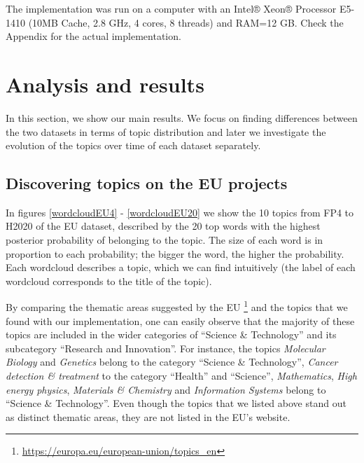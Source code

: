 \documentclass[12pt]{report}
\begin{document}
The implementation was run on a computer with an Intel® Xeon® Processor E5-1410
(10MB Cache, 2.8 GHz, 4 cores, 8 threads) and RAM=12 GB. Check the Appendix for 
the actual implementation.
\pagebreak

\section{Analysis and results}
\label{analysis}
In this section, we show our main results. We focus on finding
differences between the two datasets in terms of topic distribution
and later we investigate the evolution of the topics over time of each
dataset separately.

\subsection{Discovering topics on the EU projects}

In figures \ref{wordcloudEU4} - \ref{wordcloudEU20} we show the 10 topics from FP4 to H2020 of the EU dataset, described by
the 20 top words with the highest posterior probability of belonging
to the topic. The size of each word is in proportion to each
probability; the bigger the word, the higher the probability. 
Each wordcloud describes a topic, which we can find intuitively (the label 
of each wordcloud corresponds to the title of the topic).

By comparing the thematic areas suggested by the EU
\footnote{\url{https://europa.eu/european-union/topics_en}} and the topics that
we found with our implementation, one can easily observe that the majority of
these topics are included in the wider categories of ``Science \& Technology''
and its subcategory ``Research and Innovation''. For instance, the topics
\emph{Molecular Biology} and \emph{Genetics} belong to the category ``Science \&
Technology'', \emph{Cancer detection \& treatment} to the category ``Health''
and ``Science'', \emph{Mathematics}, \emph{High energy physics}, \emph{Materials
\& Chemistry} and \emph{Information Systems} belong to ``Science \&
Technology''. Even though the topics that we listed above stand out as distinct
thematic areas, they are not listed in the EU's website.
\end{document}
